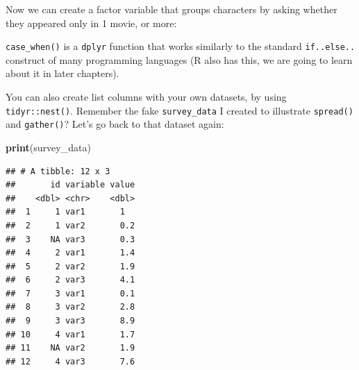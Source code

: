 \documentclass[]{gitbook}
\newenvironment{Shaded}{\begin{snugshade}}{\end{snugshade}}
\newcommand{\DataTypeTok}[1]{\textcolor[rgb]{0.13,0.29,0.53}{#1}}
\newcommand{\DecValTok}[1]{\textcolor[rgb]{0.00,0.00,0.81}{#1}}
\newcommand{\KeywordTok}[1]{\textcolor[rgb]{0.13,0.29,0.53}{\textbf{#1}}}
\newcommand{\NormalTok}[1]{#1}
\newcommand{\OperatorTok}[1]{\textcolor[rgb]{0.81,0.36,0.00}{\textbf{#1}}}
\newcommand{\StringTok}[1]{\textcolor[rgb]{0.31,0.60,0.02}{#1}}
\theoremstyle{definition}
\theoremstyle{definition}
\theoremstyle{definition}
\theoremstyle{remark}
\begin{document}
Now we can create a factor variable that groups characters by asking
whether they appeared only in 1 movie, or more:

\begin{Shaded}
\end{Shaded}

\texttt{case\_when()} is a \texttt{dplyr} function that works similarly
to the standard \texttt{if..else..} construct of many programming
languages (R also has this, we are going to learn about it in later
chapters).

You can also create list columns with your own datasets, by using
\texttt{tidyr::nest()}. Remember the fake \texttt{survey\_data} I
created to illustrate \texttt{spread()} and \texttt{gather()}? Let's go
back to that dataset again:

\begin{Shaded}
\begin{Highlighting}[]
\KeywordTok{print}\NormalTok{(survey_data)}
\end{Highlighting}
\end{Shaded}

\begin{verbatim}
## # A tibble: 12 x 3
##       id variable value
##    <dbl> <chr>    <dbl>
##  1     1 var1       1  
##  2     1 var2       0.2
##  3    NA var3       0.3
##  4     2 var1       1.4
##  5     2 var2       1.9
##  6     2 var3       4.1
##  7     3 var1       0.1
##  8     3 var2       2.8
##  9     3 var3       8.9
## 10     4 var1       1.7
## 11    NA var2       1.9
## 12     4 var3       7.6
\end{verbatim}

\begin{Shaded}
\end{Shaded}
\end{document}
